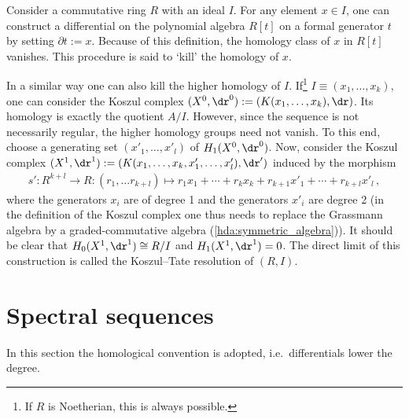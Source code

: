     \begin{property}\label{homalg:koszul_tate_resolution}
        Consider a commutative ring $R$ with an ideal $I$. For any element $x\in I$, one can construct a differential on the polynomial algebra $R[t]$ on a formal generator $t$ by setting $\partial t:=x$. Because of this definition, the homology class of $x$ in $R[t]$ vanishes. This procedure is said to `kill' the homology of $x$.

        In a similar way one can also kill the higher homology of $I$. If\footnote{If $R$ is Noetherian, this is always possible.} $I\equiv(x_1,\ldots,x_k)$, one can consider the Koszul complex $(X^0,\dr^0):=(K(x_1,\ldots,x_k),\dr)$. Its homology is exactly the quotient $A/I$. However, since the sequence is not necessarily regular, the higher homology groups need not vanish. To this end, choose a generating set $(x'_1,\ldots,x'_l)$ of $H_1(X^0,\dr^0)$. Now, consider the Koszul complex $(X^1,\dr^1):=(K(x_1,\ldots,x_k,x'_1,\ldots,x'_l),\dr')$ induced by the morphism
        \begin{gather}
            s':R^{k+l}\rightarrow R:(r_1,\ldots r_{k+l})\mapsto r_1x_1+\cdots+r_kx_k+r_{k+1}x'_1+\cdots+r_{k+l}x'_l\,,
        \end{gather}
        where the generators $x_i$ are of degree 1 and the generators $x'_i$ are degree 2 (in the definition of the Koszul complex one thus needs to replace the Grassmann algebra by a graded-commutative algebra (\cref{hda:symmetric_algebra})). It should be clear that $H_0(X^1,\dr^1)\cong R/I$ and $H_1(X^1,\dr^1)=0$. The direct limit of this construction is called the Koszul--Tate resolution of $(R,I)$.
    \end{property}

\section{Spectral sequences}

	In this section the homological convention is adopted, i.e.~differentials lower the degree.


